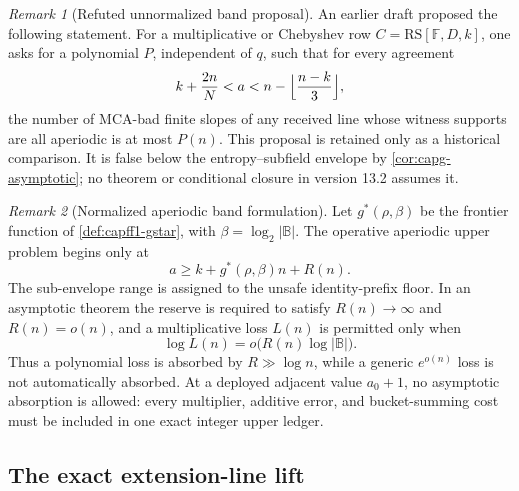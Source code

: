 \documentclass[11pt]{article}
\theoremstyle{definition}
\theoremstyle{remark}
\newtheorem{remark}[remark]{Remark}
\newcommand{\F}{\mathbb{F}}
\newcommand{\B}{\mathbb{B}}
\newcommand{\RS}{\mathrm{RS}}
\begin{document}
\begin{remark}[Refuted unnormalized band proposal]\label{prob:band}
An earlier draft proposed the following statement.  For a multiplicative or Chebyshev row $C=\RS[\F,D,k]$, one asks for a polynomial $P$, independent of $q$, such that for every agreement
\[
 k+\frac{2n}{N}<a<n-\Bigl\lfloor\frac{n-k}{3}\Bigr\rfloor,
\]
the number of MCA-bad finite slopes of any received line whose witness supports are all aperiodic is at most $P(n)$.  This proposal is retained only as a historical comparison.  It is false below the entropy--subfield envelope by \cref{cor:capg-asymptotic}; no theorem or conditional closure in version 13.2 assumes it.
\end{remark}

\begin{remark}[Normalized aperiodic band formulation]\label{prob:capfr1-normalized-band}
Let $g^*(\rho,\beta)$ be the frontier function of \cref{def:capff1-gstar}, with $\beta=\log_2|\B|$.  The operative aperiodic upper problem begins only at
\[
        a\ge k+g^*(\rho,\beta)n+R(n).
\]
The sub-envelope range is assigned to the unsafe identity-prefix floor.  In an asymptotic theorem the reserve is required to satisfy $R(n)\to\infty$ and $R(n)=o(n)$, and a multiplicative loss $L(n)$ is permitted only when
\[
        \log L(n)=o\!\bigl(R(n)\log|\B|\bigr).
\]
Thus a polynomial loss is absorbed by $R\gg\log n$, while a generic $e^{o(n)}$ loss is not automatically absorbed.  At a deployed adjacent value $a_0+1$, no asymptotic absorption is allowed: every multiplier, additive error, and bucket-summing cost must be included in one exact integer upper ledger.
\end{remark}

\subsection{The exact extension-line lift}\label{sec:discharge-T3}
\end{document}
